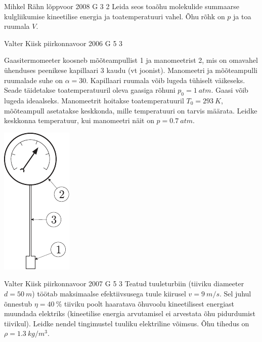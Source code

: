 \documentclass[11pt, twoside]{article}
\begin{document}
{%
{Mihkel Rähn} %
{lõppvoor} %
{2008} %
{G 3} %
{2} %
{
\ifStatement
Leida seos toaõhu molekulide summaarse kulgliikumise kineetilise energia ja toatemperatuuri vahel. Õhu rõhk on $p$ ja toa ruumala $V$.
\fi
}

{Valter Kiisk} %
{piirkonnavoor} %
{2006} %
{G 5} %
{3} %
{
\ifStatement
Gaasitermomeeter koosneb mõõteampullist 1 ja manomeetrist 2, mis on omavahel ühenduses peenikese kapillaari 3 kaudu (vt joonist). Manomeetri ja mõõteampulli ruumalade suhe on $\alpha = 30$. Kapillaari ruumala võib lugeda tühiselt väikeseks. Seade täidetakse toatemperatuuril oleva gaasiga rõhuni $p_0 = \SI{1}{atm}$. Gaasi võib lugeda ideaalseks. Manomeetrit hoitakse toatemperatuuril $T_0 = \SI{293}{K}$, mõõteampull asetatakse keskkonda, mille temperatuuri on tarvis määrata. Leidke keskkonna temperatuur, kui manomeetri näit on $p = \SI{0,7}{atm}$.

\begin{center}
	\includegraphics[width=0.25\linewidth]{2006-v2g-05-yl}
\end{center}
\fi
}

{Valter Kiisk} %
{piirkonnavoor} %
{2007} %
{G 5} %
{3} %
{
\ifStatement
Teatud tuuleturbiin (tiiviku diameeter $d = \SI{50}{m}$) töötab maksimaalse efektiivsusega tuule kiirusel $v = \SI{9}{m/s}$. Sel juhul õnnestub $\eta = \SI{40}{\%}$ tiiviku poolt haaratava õhuvoolu kineetilisest energiast muundada elektriks (kineetilise energia arvutamisel ei arvestata õhu pidurdumist tiivikul). Leidke nendel tingimustel tuuliku elektriline võimsus. Õhu tihedus on $\rho = \SI{1,3}{kg/m^3}$.
\fi
}

}
\end{document}
